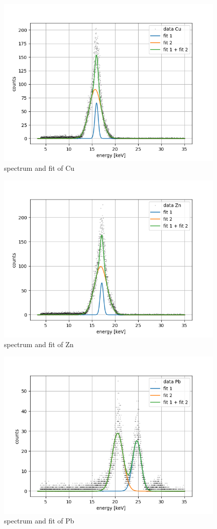 \begin{figure}[H]
    \centering
    \includegraphics[width=110mm,scale=0.5]{MAX/include/plotsCu.png}
    \caption{spectrum and fit of Cu}
\end{figure}
\begin{figure}[H]
    \centering
    \includegraphics[width=110mm,scale=0.5]{MAX/include/plotsZn.png}
    \caption{spectrum and fit of Zn}
\end{figure}
\begin{figure}[H]
    \centering
    \includegraphics[width=110mm,scale=0.5]{MAX/include/plotsPb.png}
    \caption{spectrum and fit of Pb}
\end{figure}

